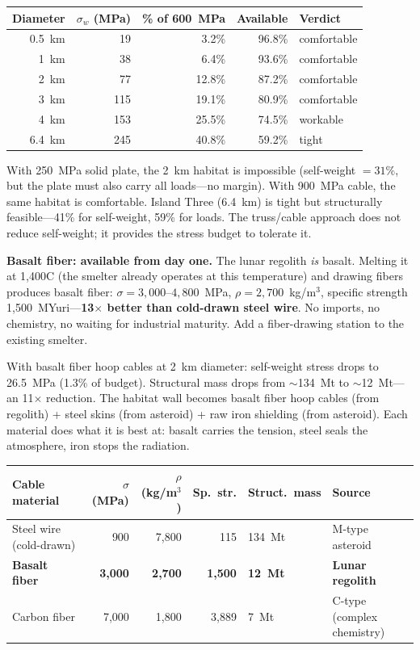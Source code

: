 \documentclass[12pt,letterpaper]{article}
\begin{document}
\begin{center}
\small
\begin{tabular}{rrrrl}
\toprule
\textbf{Diameter} & \textbf{$\sigma_w$ (MPa)} & \textbf{\% of 600~MPa} & \textbf{Available} & \textbf{Verdict} \\
\midrule
0.5~km & 19 & 3.2\% & 96.8\% & comfortable \\
1~km & 38 & 6.4\% & 93.6\% & comfortable \\
2~km & 77 & 12.8\% & 87.2\% & comfortable \\
3~km & 115 & 19.1\% & 80.9\% & comfortable \\
4~km & 153 & 25.5\% & 74.5\% & workable \\
6.4~km & 245 & 40.8\% & 59.2\% & tight \\
\bottomrule
\end{tabular}
\end{center}

With 250~MPa solid plate, the 2~km habitat is impossible (self-weight $= 31\%$, but the plate must also carry all loads---no margin). With 900~MPa cable, the same habitat is comfortable. Island Three (6.4~km) is tight but structurally feasible---41\% for self-weight, 59\% for loads. The truss/cable approach does not reduce self-weight; it provides the stress budget to tolerate it.

\textbf{Basalt fiber: available from day one.} The lunar regolith \emph{is} basalt. Melting it at 1,400\textdegree C (the smelter already operates at this temperature) and drawing fibers produces basalt fiber: $\sigma = 3{,}000$--$4{,}800$~MPa, $\rho = 2{,}700$~kg/m$^3$, specific strength 1,500~MYuri---\textbf{13$\times$ better than cold-drawn steel wire}. No imports, no chemistry, no waiting for industrial maturity. Add a fiber-drawing station to the existing smelter.

With basalt fiber hoop cables at 2~km diameter: self-weight stress drops to 26.5~MPa (1.3\% of budget). Structural mass drops from $\sim$134~Mt to $\sim$12~Mt---an 11$\times$ reduction. The habitat wall becomes basalt fiber hoop cables (from regolith) + steel skins (from asteroid) + raw iron shielding (from asteroid). Each material does what it is best at: basalt carries the tension, steel seals the atmosphere, iron stops the radiation.

\begin{center}
\small
\begin{tabular}{lrrrll}
\toprule
\textbf{Cable material} & \textbf{$\sigma$ (MPa)} & \textbf{$\rho$ (kg/m$^3$)} & \textbf{Sp.\ str.} & \textbf{Struct.\ mass} & \textbf{Source} \\
\midrule
Steel wire (cold-drawn) & 900 & 7,800 & 115 & 134~Mt & M-type asteroid \\
\textbf{Basalt fiber} & \textbf{3,000} & \textbf{2,700} & \textbf{1,500} & \textbf{12~Mt} & \textbf{Lunar regolith} \\
Carbon fiber & 7,000 & 1,800 & 3,889 & 7~Mt & C-type (complex chemistry) \\
\bottomrule
\end{tabular}
\end{center}
\end{document}
